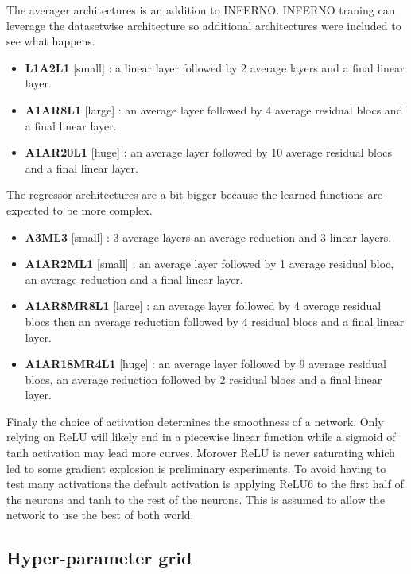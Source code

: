 The averager architectures is an addition to INFERNO.
INFERNO traning can leverage the datasetwise architecture so additional architectures were included to see what happens.
\begin{itemize}
	\item \textbf{L1A2L1} [small] : a linear layer followed by 2 average layers and a final linear layer.
	\item \textbf{A1AR8L1} [large] : an average layer followed by 4 average residual blocs and a final linear layer.
	\item \textbf{A1AR20L1} [huge] : an average layer followed by 10 average residual blocs and a final linear layer.
\end{itemize}

The regressor architectures are a bit bigger because the learned functions are expected to be more complex.
\begin{itemize}
	\item \textbf{A3ML3} [small] : 3 average layers an average reduction and 3 linear layers.
	\item \textbf{A1AR2ML1} [small] : an average layer followed by 1 average residual bloc, an average reduction and a final linear layer.
	\item \textbf{A1AR8MR8L1} [large] : an average layer followed by 4 average residual blocs then an average reduction followed by 4 residual blocs and a final linear layer.
	\item \textbf{A1AR18MR4L1} [huge] : an average layer followed by 9 average residual blocs, an average reduction followed by 2 residual blocs and a final linear layer.
\end{itemize}

Finaly the choice of activation determines the smoothness of a network.
Only relying on ReLU will likely end in a piecewise linear function while a sigmoid of tanh activation may lead more curves.
Morover ReLU is never saturating which led to some gradient explosion is preliminary experiments. 
To avoid having to test many activations the default activation is applying ReLU6 to the first half of the neurons and tanh to the rest of the neurons.
This is assumed to allow the network to use the best of both world.






\subsection{Hyper-parameter grid} %
\label{sub:hyper_parameter_grid}

